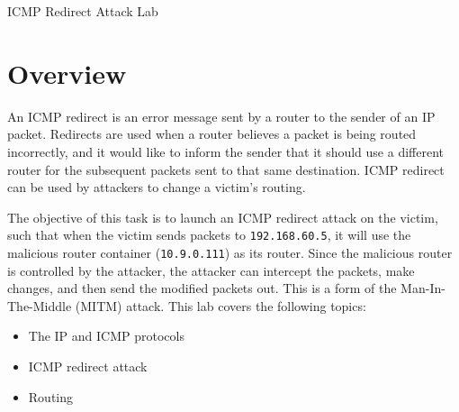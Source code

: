 
\newcommand{\commonfolder}{../../common-files}




\newcommand{\ipFigs}{./Figs}






\begin{center}
{\LARGE ICMP Redirect Attack Lab}
\end{center}



\section{Overview}

An ICMP redirect is an error message sent by a router to the sender of an
IP packet. Redirects are used when a router believes a packet is being
routed incorrectly, and it would like to inform the sender that it should
use a different router for the subsequent packets sent to that same
destination. ICMP redirect can be used by attackers to change
a victim's routing.

The objective of this task is to launch an ICMP redirect attack on the victim,
such that when the victim sends packets to \texttt{192.168.60.5},
it will use the malicious router container (\texttt{10.9.0.111})
as its router.
Since the malicious router is controlled by the attacker, the attacker can
intercept the packets, make changes, and then send
the modified packets out. This is a form of the Man-In-The-Middle (MITM) attack.
This lab covers the following topics:

\begin{itemize}[noitemsep]
\item The IP and ICMP protocols
\item ICMP redirect attack
\item Routing 
\end{itemize}


